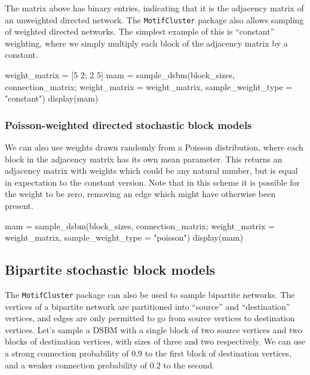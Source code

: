 \documentclass{article}
\begin{document}
The matrix above has binary entries,
indicating that it is the adjacency matrix of an unweighted
directed network.
The \texttt{MotifCluster} package also allows sampling of weighted directed networks.
The simplest example of this is ``constant'' weighting,
where we simply multiply each block of the adjacency matrix by a constant.

\begin{tcolorbox}[colback=black!5!white,colframe=black!15!white]
\begin{juliablock}
weight_matrix = [5 2; 2 5]
mam = sample_dsbm(block_sizes, connection_matrix;
                  weight_matrix = weight_matrix, sample_weight_type = "constant")
display(mam)
\end{juliablock}
\texttt{\obeylines\printpythontex}
\end{tcolorbox}

\subsubsection{Poisson-weighted directed stochastic block models}

We can also use weights drawn randomly from a Poisson distribution,
where each block in the adjacency matrix has its own mean parameter.
This returns an adjacency matrix with weights which could be any natural
number, but is equal in expectation to the constant version.
Note that in this scheme it is possible for the weight to be zero,
removing an edge which might have otherwise been present.

\begin{tcolorbox}[colback=black!5!white,colframe=black!15!white]
\begin{juliablock}
mam = sample_dsbm(block_sizes, connection_matrix;
                  weight_matrix = weight_matrix,
                  sample_weight_type = "poisson")
display(mam)
\end{juliablock}
\texttt{\obeylines\printpythontex}
\end{tcolorbox}


\subsection{Bipartite stochastic block models}

The \texttt{MotifCluster} package can also be used to sample
bipartite networks.
The vertices of a bipartite network are partitioned
into ``source'' and ``destination'' vertices,
and edges are only permitted to go from source vertices
to destination vertices.
Let's sample a DSBM with a single block of two source vertices
and two blocks of destination vertices, with
sizes of three and two respectively.
We can use a strong connection probability of 0.9 to the first block of
destination vertices,
and a weaker connection probability of 0.2 to the second.
\end{document}
